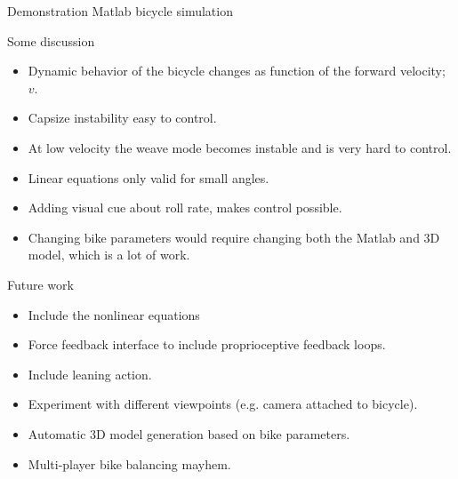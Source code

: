 \documentclass{beamer}
\begin{document}
\begin{frame}{Demonstration}
			Matlab bicycle simulation 
\end{frame}

\begin{frame}{Some discussion}
			\begin{itemize}
			\item Dynamic behavior of the bicycle changes as function of the forward velocity; $v$.
			\item Capsize instability easy to control.
			\item At low velocity the weave mode becomes instable and is very hard to control.
			\item Linear equations only valid for small angles.
			\item Adding visual cue about roll rate, makes control possible.
			\item Changing bike parameters would require changing both the Matlab and 3D model, which is a lot of work.
			\end{itemize}
\end{frame}

\begin{frame}{Future work}
			\begin{itemize}
			\item Include the nonlinear equations
			\item Force feedback interface to include proprioceptive feedback loops.
			\item Include leaning action.
			\item Experiment with different viewpoints (e.g. camera attached to bicycle).
			\item Automatic 3D model generation based on bike parameters.
			\item Multi-player bike balancing mayhem.
			\end{itemize}
\end{frame}
\end{document}
